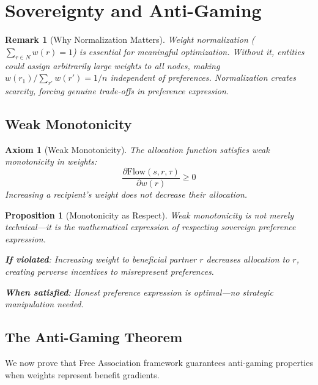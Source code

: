 \documentclass[11pt]{article}
\newtheorem{proposition}{Proposition}
\newtheorem{remark}{Remark}
\newtheorem{axiom}{Axiom}
\begin{document}
\section{Sovereignty and Anti-Gaming}

\begin{remark}[Why Normalization Matters]
Weight normalization ($\sum_{r \in N} w(r) = 1$) is essential for meaningful optimization. Without it, entities could assign arbitrarily large weights to all nodes, making $w(r_1)/\sum_{r'} w(r') = 1/n$ independent of preferences. Normalization creates scarcity, forcing genuine trade-offs in preference expression.
\end{remark}

\subsection{Weak Monotonicity}

\begin{axiom}[Weak Monotonicity]
\label{ax:weak-monotonicity}
The allocation function satisfies weak monotonicity in weights:
\[
\frac{\partial \text{Flow}(s, r, \tau)}{\partial w(r)} \geq 0
\]
Increasing a recipient's weight does not decrease their allocation.
\end{axiom}

\begin{proposition}[Monotonicity as Respect]
Weak monotonicity is not merely technical—it is the mathematical expression of respecting sovereign preference expression.

\textbf{If violated}: Increasing weight to beneficial partner $r$ decreases allocation to $r$, creating perverse incentives to misrepresent preferences.

\textbf{When satisfied}: Honest preference expression is optimal—no strategic manipulation needed.
\end{proposition}

\subsection{The Anti-Gaming Theorem}

We now prove that Free Association framework guarantees anti-gaming properties when weights represent benefit gradients.
\end{document}
